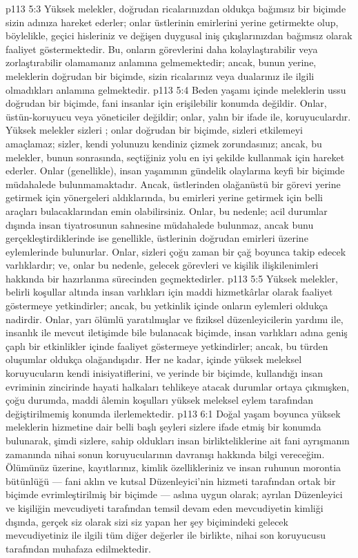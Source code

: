 \vs p113 5:3 Yüksek melekler, doğrudan ricalarınızdan oldukça bağımsız bir biçimde sizin adınıza hareket ederler; onlar üstlerinin emirlerini yerine getirmekte olup, böylelikle, geçici hisleriniz ve değişen duygusal iniş çıkışlarınızdan bağımsız olarak faaliyet göstermektedir. Bu, onların görevlerini daha kolaylaştırabilir veya zorlaştırabilir olamamanız anlamına gelmemektedir; ancak, bunun yerine, meleklerin doğrudan bir biçimde, sizin ricalarınız veya dualarınız ile ilgili olmadıkları anlamına gelmektedir.
\vs p113 5:4 Beden yaşamı içinde meleklerin ussu doğrudan bir biçimde, fani insanlar için erişilebilir konumda değildir. Onlar, üstün\hyp{}koruyucu veya yöneticiler değildir; onlar, yalın bir ifade ile, koruyuculardır. Yüksek melekler sizleri ; onlar doğrudan bir biçimde, sizleri etkilemeyi amaçlamaz; sizler, kendi yolunuzu kendiniz çizmek zorundasınız; ancak, bu melekler, bunun sonrasında, seçtiğiniz yolu en iyi şekilde kullanmak için hareket ederler. Onlar (genellikle), insan yaşamının gündelik olaylarına keyfi bir biçimde müdahalede bulunmamaktadır. Ancak, üstlerinden olağanüstü bir görevi yerine getirmek için yönergeleri aldıklarında, bu emirleri yerine getirmek için belli araçları bulacaklarından emin olabilirsiniz. Onlar, bu nedenle; acil durumlar dışında insan tiyatrosunun sahnesine müdahalede bulunmaz, ancak bunu gerçekleştirdiklerinde ise genellikle, üstlerinin doğrudan emirleri üzerine eylemlerinde bulunurlar. Onlar, sizleri çoğu zaman bir çağ boyunca takip edecek varlıklardır; ve, onlar bu nedenle, gelecek görevleri ve kişilik ilişkilenimleri hakkında bir hazırlanma sürecinden geçmektedirler.
\vs p113 5:5 Yüksek melekler, belirli koşullar altında insan varlıkları için maddi hizmetkârlar olarak faaliyet göstermeye yetkindirler; ancak, bu yetkinlik içinde onların eylemleri oldukça nadirdir. Onlar, yarı ölümlü yaratılmışlar ve fiziksel düzenleyicilerin yardımı ile, insanlık ile mevcut iletişimde bile bulanacak biçimde, insan varlıkları adına geniş çaplı bir etkinlikler içinde faaliyet göstermeye yetkindirler; ancak, bu türden oluşumlar oldukça olağandışıdır. Her ne kadar, içinde yüksek meleksel koruyucuların kendi inisiyatiflerini, ve yerinde bir biçimde, kullandığı insan evriminin zincirinde hayati halkaları tehlikeye atacak durumlar ortaya çıkmışken, çoğu durumda, maddi âlemin koşulları yüksek meleksel eylem tarafından değiştirilmemiş konumda ilerlemektedir.
\vs p113 6:1 Doğal yaşam boyunca yüksek meleklerin hizmetine dair belli başlı şeyleri sizlere ifade etmiş bir konumda bulunarak, şimdi sizlere, sahip oldukları insan birlikteliklerine ait fani ayrışmanın zamanında nihai sonun koruyucularının davranışı hakkında bilgi vereceğim. Ölümünüz üzerine, kayıtlarınız, kimlik özellikleriniz ve insan ruhunun morontia bütünlüğü --- fani aklın ve kutsal Düzenleyici’nin hizmeti tarafından ortak bir biçimde evrimleştirilmiş bir biçimde --- aslına uygun olarak; ayrılan Düzenleyici ve kişiliğin mevcudiyeti tarafından temsil devam eden mevcudiyetin kimliği dışında, gerçek siz olarak sizi siz yapan her şey biçimindeki gelecek mevcudiyetiniz ile ilgili tüm diğer değerler ile birlikte, nihai son koruyucusu tarafından muhafaza edilmektedir.
